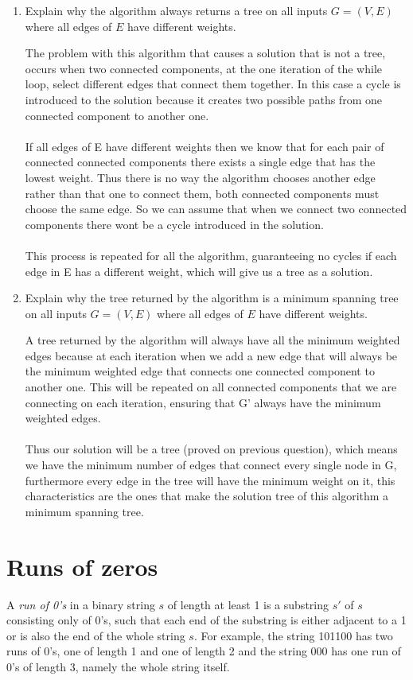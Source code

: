 \documentclass[11pt]{article}
\def\question#1{\red{#1}}
\def\soln#1{\par\blu{#1}} %
\def\blu#1{{\color{blu}#1}}
\def\red#1{{\color{red}#1}}
\begin{document}
\begin{enumerate}
\item \question{Explain why the algorithm always returns a tree on all inputs $G = (V,E)$ where all edges of $E$ have different weights.}
\soln{
   The problem with this algorithm that causes a solution that is not a tree, occurs when 
   two connected components, at the one iteration of the while loop, select different edges 
   that connect them together. In this case a cycle is introduced to the solution because 
   it creates two possible paths from one connected component to another one. \\ \\
   If all edges of E have different weights then we know that for each pair of connected 
   connected components there exists a single edge that has the lowest weight. Thus there is 
   no way the algorithm chooses another edge rather than that one to connect them, both 
   connected components must choose the same edge. So we can assume that when we connect 
   two connected components there wont be a cycle introduced in the solution. \\ \\ 
   This process is repeated for all the algorithm, guaranteeing no cycles if each edge in E 
   has a different weight, which will give us a tree as a solution. \\ 
}

\item \question{Explain why the tree returned by the algorithm is a minimum spanning tree on all inputs $G = (V,E)$ where all edges of $E$ have different weights.}
\soln{
   A tree returned by the algorithm will always have all the minimum weighted edges because 
   at each iteration when we add a new edge that will always be the minimum weighted edge
   that connects one connected component to another one. This will be repeated on all connected 
   components that we are connecting on each iteration, ensuring that G' always have the 
   minimum weighted edges. \\ \\
   Thus our solution will be a tree (proved on previous question), which means we have the 
   minimum number of edges that connect every single node in G, furthermore every edge in the 
   tree will have the minimum weight on it, this characteristics are the ones that make the 
   solution tree of this algorithm a minimum spanning tree.
}
\end{enumerate}

\section{Runs of zeros}
\label{sec-3}
A \emph{run of 0's} in a binary string $s$ of length at least 1 is a substring $s'$ of $s$ consisting
only of 0's, such that each end of the substring is either adjacent
to a 1 or is also the end of the whole string $s$. For example,
the string 101100 has two runs of 0's, one of length 1 and one of
length 2 and the string 000 has one run of 0's of length 3, namely
the whole string itself.
\end{document}
